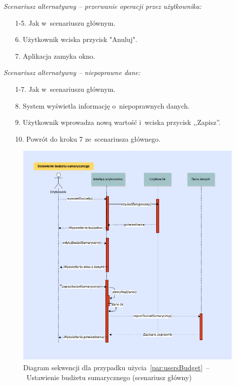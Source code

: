 \noindent \textit{Scenariusz alternatywny -- przerwanie operacji przez użytkownika:}
\begin{enumerate}
  \item[1-5.] Jak w~scenariuszu głównym.
  \item[6.] Użytkownik wciska przycisk "Anuluj".
  \item[7.] Aplikacja zamyka okno.
\end{enumerate}

\noindent \textit{Scenariusz alternatywny -- niepoprawne dane:}
\begin{enumerate}
  \item[1-7.] Jak w~scenariuszu głównym.
  \item[8.] System wyświetla informację o~niepoprawnych danych.
  \item[9.] Użytkownik wprowadza nową wartość i~wciska przycisk ,,Zapisz''.
  \item[10.] Powrót do kroku 7 ze~scenariusza głównego.
\end{enumerate}

\begin{figure}[H]
  \includegraphics[width=\textwidth]{images/modyfikacja_budzetu_sumarycznego.png}
  \caption{Diagram sekwencji dla przypadku użycia~\ref{par:usersBudget}~--~Ustawienie budżetu sumarycznego (scenariusz główny)}
\end{figure}


